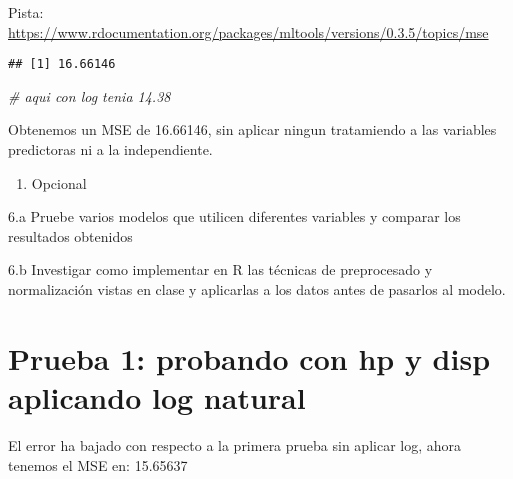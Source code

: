 \documentclass[]{article}
\newenvironment{Shaded}{\begin{snugshade}}{\end{snugshade}}
\newcommand{\CommentTok}[1]{\textcolor[rgb]{0.56,0.35,0.01}{\textit{#1}}}
\newcommand{\DataTypeTok}[1]{\textcolor[rgb]{0.13,0.29,0.53}{#1}}
\newcommand{\KeywordTok}[1]{\textcolor[rgb]{0.13,0.29,0.53}{\textbf{#1}}}
\newcommand{\NormalTok}[1]{#1}
\newcommand{\OperatorTok}[1]{\textcolor[rgb]{0.81,0.36,0.00}{\textbf{#1}}}
\providecommand{\tightlist}{%
  \setlength{\itemsep}{0pt}\setlength{\parskip}{0pt}}
\begin{document}
Pista:
\url{https://www.rdocumentation.org/packages/mltools/versions/0.3.5/topics/mse}

\begin{Shaded}
\end{Shaded}

\begin{verbatim}
## [1] 16.66146
\end{verbatim}

\begin{Shaded}
\begin{Highlighting}[]
\CommentTok{# aqui con log tenia 14.38}
\end{Highlighting}
\end{Shaded}

Obtenemos un MSE de 16.66146, sin aplicar ningun tratamiendo a las
variables predictoras ni a la independiente.

\begin{enumerate}
\def\labelenumi{\arabic{enumi}.}
\setcounter{enumi}{5}
\tightlist
\item
  Opcional
\end{enumerate}

6.a Pruebe varios modelos que utilicen diferentes variables y comparar
los resultados obtenidos

6.b Investigar como implementar en R las técnicas de preprocesado y
normalización vistas en clase y aplicarlas a los datos antes de pasarlos
al modelo.

\hypertarget{prueba-1-probando-con-hp-y-disp-aplicando-log-natural}{%
\section{Prueba 1: probando con hp y disp aplicando log
natural}\label{prueba-1-probando-con-hp-y-disp-aplicando-log-natural}}

El error ha bajado con respecto a la primera prueba sin aplicar log,
ahora tenemos el MSE en: 15.65637
\end{document}
